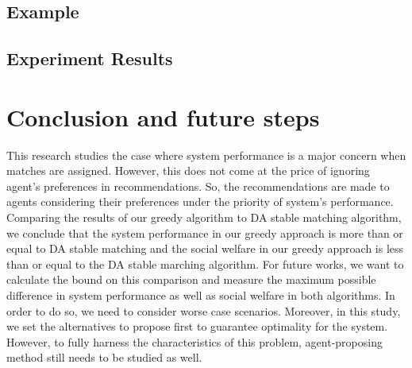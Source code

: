 \documentclass[11pt, letterpaper]{article}
\begin{document}
	\subsection{Example}

\subsection{Experiment Results}


\section{Conclusion and future steps}
This research studies the case where system performance is a major concern when matches are assigned. However, this does not come at the price of ignoring agent's preferences in recommendations. So, the recommendations are made to agents considering their preferences under the priority of system's performance. Comparing the results of our greedy algorithm to DA stable matching algorithm, we conclude that the system performance in our greedy approach is more than or equal to DA stable matching and the social welfare in our greedy approach is less than or equal to the DA stable marching algorithm. 
For future works, we want to calculate the bound on this comparison and measure the maximum possible difference in system performance as well as social welfare in both algorithms. In order to do so, we need to consider worse case scenarios. 
Moreover, in this study, we set the alternatives to propose first to guarantee optimality for the system. However, to fully harness the characteristics of this problem, agent-proposing method still needs to be studied as well. 

\newpage
%
\setcounter{page}{1}

\end{document}
